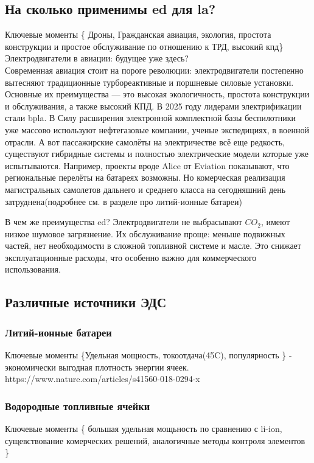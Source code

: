 \subsection{На сколько применимы \acs{ed} для \acs{la}?}
Ключевые моменты \{ Дроны, Гражданская авиация, экология, простота 
конструкции и простое обслуживание по отношению к ТРД, высокий кпд\} \\

Электродвигатели в авиации: будущее уже здесь? \\
Современная авиация стоит на пороге революции: электродвигатели постепенно вытесняют традиционные турбореактивные и поршневые силовые установки.
Основные их преимущества --- это высокая экологичность, простота конструкции и обслуживания, а также высокий КПД.
В 2025 году лидерами электрификации стали \acs{bpla}. В Силу расширения электронной комплектной базы беспилотники уже массово используют нефтегазовые компании, 
ученые экспедициях, в военной отрасли.
А вот пассажирские самолёты на электричестве всё еще редкость, существуют гибридные системы и полностью электрические модели которые уже испытываются. 
Например, проекты вроде Alice от Eviation показывают, что региональные перелёты на батареях возможны. 
Но комерческая реализация магистральных самолетов дальнего и среднего класса на сегодняшний день затруднена(подробнее см. в разделе про литий-ионные батареи)

В чем же преимущества \acs{ed}?
Электродвигатели не выбрасывают ${CO}_2$, имеют низкое шумовое загрязнение. Их обслуживание проще: 
    меньше подвижных частей, 
    нет необходимости в сложной топливной системе и масле. 
    Это снижает эксплуатационные расходы, что особенно важно для коммерческого использования.
\subsection{Различные источники ЭДС}

\subsubsection{Литий-ионные батареи}
Ключевые моменты \{Удельная мощность, токоотдача(45C), популярность \}
\cite{schafer2019technological} - экономически выгодная плотность энергии ячеек.
https://www.nature.com/articles/s41560-018-0294-x
 
\subsubsection{Водородные топливные ячейки}
Ключевые моменты \{ большая удельная мощьность по сравнению с li-ion, сущевствование комерческих решений,
аналогичные методы контроля элементов \}